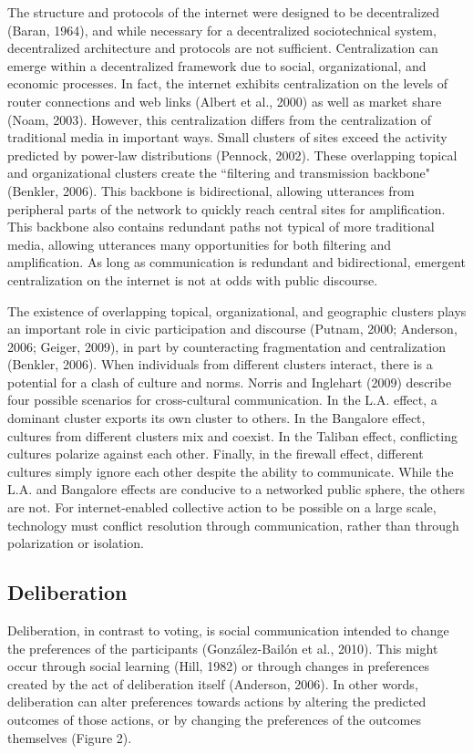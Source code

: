 The structure and protocols of the internet were designed to be decentralized (Baran, 1964), and while necessary for a decentralized sociotechnical system, decentralized architecture and protocols are not sufficient. Centralization can emerge within a decentralized framework due to social, organizational, and economic processes. In fact, the internet exhibits centralization on the levels of router connections and web links (Albert et al., 2000) as well as market share (Noam, 2003). However, this centralization differs from the centralization of traditional media in important ways. Small clusters of sites exceed the activity predicted by power-law distributions (Pennock, 2002). These overlapping topical and organizational clusters create the ``filtering and transmission backbone" (Benkler, 2006). This backbone is bidirectional, allowing utterances from peripheral parts of the network to quickly reach central sites for amplification. This backbone also contains redundant paths not typical of more traditional media, allowing utterances many opportunities for both filtering and amplification. As long as communication is redundant and bidirectional, emergent centralization on the internet is not at odds with public discourse.

The existence of overlapping topical, organizational, and geographic clusters plays an important role in civic participation and discourse (Putnam, 2000; Anderson, 2006; Geiger, 2009), in part by counteracting fragmentation and centralization (Benkler, 2006). When individuals from different clusters interact, there is a potential for a clash of culture and norms. Norris and Inglehart (2009) describe four possible scenarios for cross-cultural communication. In the L.A. effect, a dominant cluster exports its own cluster to others. In the Bangalore effect, cultures from different clusters mix and coexist. In the Taliban effect, conflicting cultures polarize against each other. Finally, in the firewall effect, different cultures simply ignore each other despite the ability to communicate. While the L.A. and Bangalore effects are conducive to a networked public sphere, the others are not. For internet-enabled collective action to be possible on a large scale, technology must conflict resolution through communication, rather than through polarization or isolation.

\subsection{Deliberation}
Deliberation, in contrast to voting, is social communication intended to change the preferences of the participants (Gonz\'alez-Bail\'on et al., 2010). This might occur through social learning (Hill, 1982) or through changes in preferences created by the act of deliberation itself (Anderson, 2006). In other words, deliberation can alter preferences towards actions by altering the predicted outcomes of those actions, or by changing the preferences of the outcomes themselves (Figure 2).

